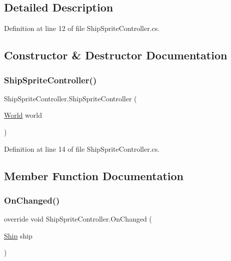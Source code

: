 \subsection{Detailed Description}


Definition at line 12 of file Ship\+Sprite\+Controller.\+cs.



\subsection{Constructor \& Destructor Documentation}
\mbox{\label{class_ship_sprite_controller_af965143d633c2693fa5cd64afba55dfb}} 
\subsubsection{\texorpdfstring{Ship\+Sprite\+Controller()}{ShipSpriteController()}}
{\footnotesize\ttfamily Ship\+Sprite\+Controller.\+Ship\+Sprite\+Controller (\begin{DoxyParamCaption}\item[{\hyperlink{class_world}{World}}]{world }\end{DoxyParamCaption})}



Definition at line 14 of file Ship\+Sprite\+Controller.\+cs.



\subsection{Member Function Documentation}
\mbox{\label{class_ship_sprite_controller_a5216e1847d20829e57a5325c275b0b97}} 
\subsubsection{\texorpdfstring{On\+Changed()}{OnChanged()}}
{\footnotesize\ttfamily override void Ship\+Sprite\+Controller.\+On\+Changed (\begin{DoxyParamCaption}\item[{\hyperlink{class_ship}{Ship}}]{ship }\end{DoxyParamCaption})\hspace{0.3cm}{\ttfamily [protected]}}



